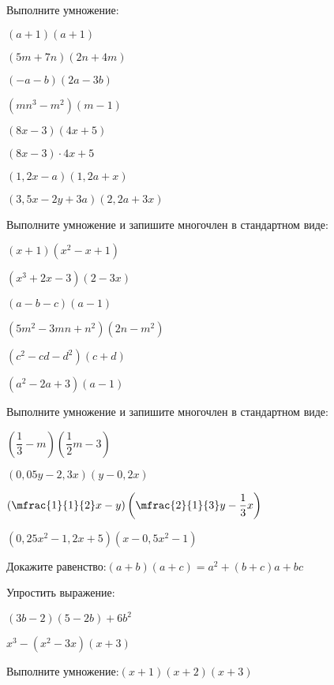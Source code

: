 %
%
\begin{class}[number=3]
	\begin{listofex}
		\item Выполните умножение:
		\begin{enumcols}[itemcolumns=2]
			\item \( (a+1)(a+1) \)
			\item \( (5m+7n)(2n+4m) \)
			\item \( (-a-b)(2a-3b) \)
			\item \( (mn^3-m^2)(m-1) \)
			\item \( (8x-3)(4x+5) \)
			\item \( (8x-3)\cdot4x+5 \)
			\item \( (1,2x-a)(1,2a+x) \)
			\item \( (3,5x-2y+3a)(2,2a+3x) \)
		\end{enumcols}
		\item Выполните умножение и запишите многочлен в стандартном виде:
		\begin{enumcols}[itemcolumns=3]
			\item \( (x+1)(x^2-x+1) \)
			\item \( (x^3+2x-3)(2-3x) \)
			\item \( (a-b-c)(a-1) \)
			\item \( (5m^2-3mn+n^2)(2n-m^2) \)
			\item \( (c^2-cd-d^2)(c+d) \)
			\item \( (a^2-2a+3)(a-1) \)
		\end{enumcols}
		\item Выполните умножение и запишите многочлен в стандартном виде:
		\begin{enumcols}[itemcolumns=2]
			\item \( \left( \dfrac{1}{3}-m \right)\left( \dfrac{1}{2}m-3 \right) \)
			\item \( (0,05y-2,3x)(y-0,2x) \)
			\item \( \left( \mfrac{1}{1}{2}x-y \right)\left( \mfrac{2}{1}{3}y-\dfrac{1}{3}x \right) \)
			\item \( (0,25x^2-1,2x+5)(x-0,5x^2-1) \)
		\end{enumcols}
		\item Докажите равенство:\quad\( (a+b)(a+c)=a^2+(b+c)a+bc \)
		\item Упростить выражение:
		\begin{enumcols}[itemcolumns=2]
			\item \( (3b-2)(5-2b)+6b^2 \)
			\item \( x^3-(x^2-3x)(x+3) \)
		\end{enumcols}
		\item Выполните умножение:\quad\( (x+1)(x+2)(x+3) \)
	\end{listofex}
\end{class}

